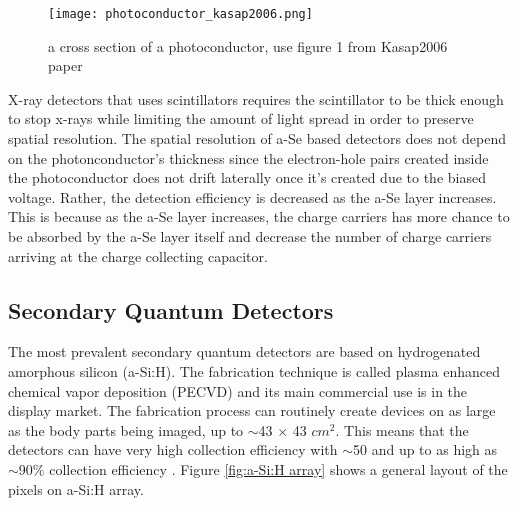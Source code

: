 \begin{figure}
\centering
\texttt{[image: photoconductor\_kasap2006.png]}
\caption{a cross section of a photoconductor, use figure 1 from Kasap2006 paper}
\label{fig:photoconductor_cross_section}
\end{figure} 


X-ray detectors that uses scintillators requires the scintillator to be thick enough to stop x-rays while limiting the amount of light spread in order to preserve spatial resolution.  The spatial resolution of a-Se based detectors does not depend on the photonconductor's thickness since the electron-hole pairs created inside the photoconductor does not drift laterally once it's created due to the biased voltage.  Rather, the detection efficiency is decreased as the a-Se layer increases.  This is because as the a-Se layer increases,  the charge carriers has more chance to be absorbed by the a-Se layer itself and decrease the number of charge carriers arriving at the charge collecting capacitor.

\subsection{Secondary Quantum Detectors}
The most prevalent secondary quantum detectors are based on hydrogenated amorphous silicon (a-Si:H).  The fabrication technique is called plasma enhanced chemical vapor deposition (PECVD) and its main commercial use is in the display market.  The fabrication process can routinely create devices on as large as the body parts being imaged, up to $\sim$43 $\times$ 43 $cm^2$.  This means that the detectors can have very high collection efficiency with $\sim$50 and up to as high as $\sim$90$\%$ collection efficiency \cite{yorkston2007}.
Figure \ref{fig:a-Si:H array} shows a general layout of the pixels on a-Si:H array.  

